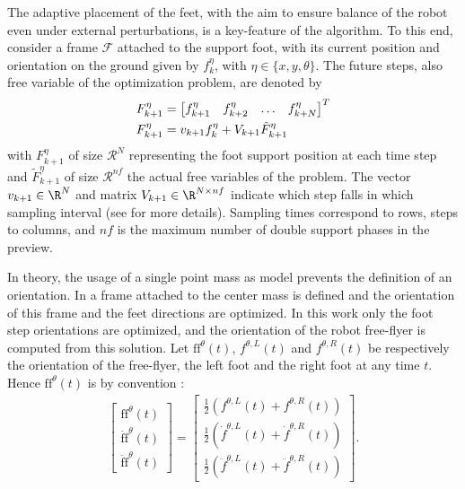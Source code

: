 The adaptive placement of the feet, with the aim to ensure balance of the robot even under external perturbations, is a key-feature of the algorithm.
To this end, consider a frame $\mathcal F$ attached to the support foot, with its current position and orientation on the ground given by $f_k^\eta$, with $\eta \in \{x,y,\theta\}$.
The future steps, also free variable of the optimization problem, are denoted by
\begin{align}
&F_{k+1}^\eta =
    \begin{bmatrix}
        f^\eta_{k+1} &
        f^\eta_{k+2} &
        \hdots &
        f^\eta_{k+N}         	
    \end{bmatrix}^T
    \notag \\
    	\label{eq:Fkp1}
&F_{k+1}^\eta = v_{k+1} f_{k}^{\eta} + V_{k+1} \tilde{F}_{k+1}^{\eta}
\end{align}
with $F_{k+1}^\eta$ of size $\mathcal{R}^N$ representing the foot support position at each time step and $\tilde{F}_{k+1}^\eta$ of size $\mathcal{R}^{nf}$ the actual free variables of the problem.
The vector $v_{k+1} \in \R^N$ and matrix $V_{k+1} \in \R^{N\times nf}$ indicate which step falls in which sampling interval (see \cite{herdt:iros:2010} for more details).
Sampling times correspond to rows, steps to columns, and $nf$ is the maximum number of double support phases in the preview.

In theory, the usage of a single point mass as model prevents the definition of an orientation.
In \cite{herdt:iros:2010} a frame attached to the center mass is defined and the orientation of this frame and the feet directions are optimized.
In this work only the foot step orientations are optimized, and the orientation of the robot free-flyer is computed from this solution.
Let $\text{ff}^{\theta}(t)$, $f^{\theta,L}(t)$ and $f^{\theta,R}(t)$ be respectively the orientation of the free-flyer, the left foot and the right foot at any time $t$.
Hence $\text{ff}^{\theta}(t)$ is by convention :
\begin{align*}
\begin{bmatrix}
	\text{ff}^{\theta}(t) \\
	\dot{\text{ff}}^{\theta}(t) \\
	\ddot{\text{ff}}^{\theta}(t)
\end{bmatrix}
=
\begin{bmatrix}
	\frac{1}{2}(f^{\theta,L}(t)        + f^{\theta,R}(t)) \\
	\frac{1}{2}(\dot{f}^{\theta,L}(t)  + \dot{f}^{\theta,R}(t)) \\
	\frac{1}{2}(\ddot{f}^{\theta,L}(t) + \ddot{f}^{\theta,R}(t))
\end{bmatrix}
.
\end{align*}

